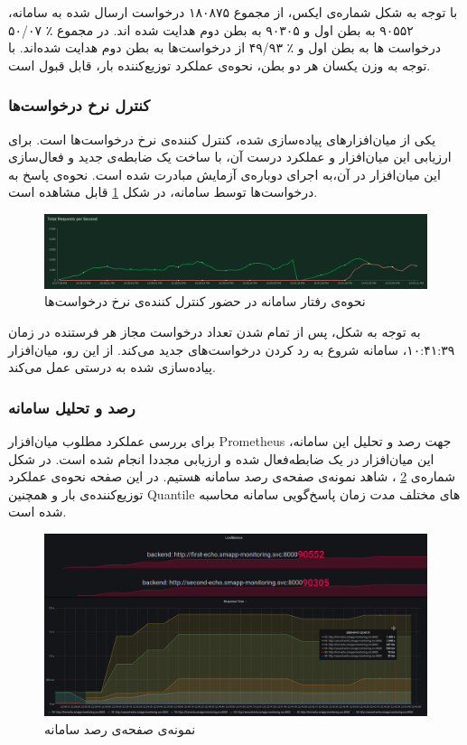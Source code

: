 با توجه به شکل شماره‌ی ایکس، از مجموع ۱۸۰۸۷۵ درخواست ارسال شده به سامانه، ۹۰۵۵۲ به بطن اول و ۹۰۳۰۵ به بطن دوم هدایت شده اند. در مجموع ٪ ۵۰/۰۷ درخواست ها به بطن اول و ٪ ۴۹/۹۳ از درخواست‌ها به بطن دوم هدایت شده‌اند. با توجه به وزن یکسان هر دو بطن، نحوه‌ی عملکرد توزیع‌کننده بار، قابل قبول است.


\subsubsection{کنترل نرخ درخواست‌ها}
یکی از میان‌افزار‌های پیاده‌سازی شده، کنترل کننده‌ی نرخ درخواست‌ها است. برای ارزیابی این میان‌افزار و عملکرد درست آن، با ساخت یک ضابطه‌ی جدید و فعال‌سازی این میان‌افزار در آن،‌به اجرای دوباره‌ی آزمایش مبادرت شده است. نحوه‌ی پاسخ به درخواست‌ها توسط سامانه، در شکل
\ref{rate}
قابل مشاهده است.

\begin{figure}[H]
    \centering
    \caption{نحوه‌ی رفتار سامانه در حضور کنترل کننده‌ی نرخ درخواست‌ها}
    \label{rate}
    \includegraphics[scale=0.23]{images/RatelimitStats.png}
\end{figure}

به توجه به شکل،‌ پس از تمام شدن تعداد درخواست مجاز هر فرستنده در زمان ۱۰:۴۱:۳۹، سامانه شروع به رد کردن درخواست‌های جدید می‌کند. از این رو، میان‌افزار پیاده‌سازی شده به درستی عمل می‌کند.

\subsubsection{رصد و تحلیل سامانه}
برای بررسی عملکرد مطلوب میان‌افزار Prometheus جهت رصد و تحلیل این سامانه، این میان‌افزار در یک ضابطه‌فعال شده و ارزیابی مجددا انجام شده است. در شکل شماره‌ی
\ref{monitoring}
، شاهد نمونه‌ی صفحه‌ی رصد سامانه هستیم. در این صفحه نحوه‌ی عملکرد توزیع‌کننده‌ی بار و همچنین Quantile های مختلف مدت زمان پاسخ‌گویی سامانه محاسبه شده است.

\begin{figure}[H]
    \centering
    \caption{نمونه‌ی صفحه‌ی رصد سامانه}
    \label{monitoring}
    \includegraphics[scale=0.23]{images/Stats.png}
\end{figure}


\cleardoublepage 
